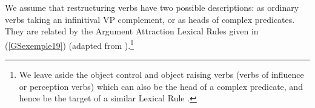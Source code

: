 {\eal
	\label{GSexemple18} 
    \label{GSexemple18a} 	
	
	\label{GSexemple18b}
\zl

We assume that restructuring verbs have two possible descriptions: as ordinary verbs taking an infinitival VP complement, or as heads of complex predicates. They are related by the Argument Attraction Lexical Rules given in (\ref{GSexemple19}) (adapted from \citealt[331]{Monachesi98a}).\footnote{We leave aside the object control and object raising verbs (verbs of influence or perception verbs) which can also be the head of a complex predicate, and hence be the target of a similar Lexical Rule \citep{AGMS98a, AG2010}.}  

\begin{exe}
	\label{GSexemple19} 
	\begin{xlist}
	

\end{xlist}
\end{exe}}
